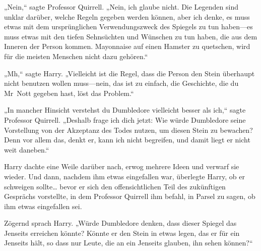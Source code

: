 „Nein,“ sagte Professor Quirrell. „Nein, ich glaube nicht. Die Legenden sind unklar darüber, welche Regeln gegeben werden können, aber ich denke, es muss etwas mit dem ursprünglichen Verwendungszweck des Spiegels zu tun haben—es muss etwas mit den tiefen Sehnsüchten und Wünschen zu tun haben, die aus dem Inneren der Person kommen. Mayonnaise auf einen Hamster zu quetschen, wird für die meisten Menschen nicht dazu gehören.“

„Mh,“ sagte Harry. „Vielleicht ist die Regel, dass die Person den Stein überhaupt nicht benutzen wollen muss—nein, das ist zu einfach, die Geschichte, die du Mr~Nott gegeben hast, löst das Problem.“

„In mancher Hinsicht verstehst du Dumbledore vielleicht besser als ich,“ sagte Professor Quirrell. „Deshalb frage ich dich jetzt: Wie würde Dumbledore seine Vorstellung von der Akzeptanz des Todes nutzen, um diesen Stein zu bewachen? Denn vor allem das, denkt er, kann ich nicht begreifen, und damit liegt er nicht weit daneben.“

Harry dachte eine Weile darüber nach, erwog mehrere Ideen und verwarf sie wieder. Und dann, nachdem ihm etwas eingefallen war, überlegte Harry, ob er schweigen sollte… bevor er sich den offensichtlichen Teil des zukünftigen Gesprächs vorstellte, in dem Professor Quirrell ihm befahl, in Parsel zu sagen, ob ihm etwas eingefallen sei.

Zögernd sprach Harry. „Würde Dumbledore denken, dass dieser Spiegel das Jenseits erreichen könnte? Könnte er den Stein in etwas legen, das er für ein Jenseits hält, so dass nur Leute, die an ein Jenseits glauben, ihn sehen können?“

